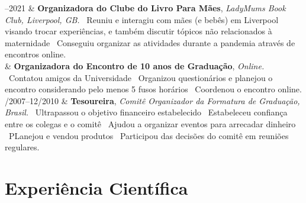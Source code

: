 \documentclass[11pt, a4paper]{article}
\newcommand{\Duration}[2]{\fontsize{10pt}{0}\selectfont #1--#2}
\newcommand{\Year}[1]{\fontsize{10pt}{0}\selectfont #1}
\begin{document}
\begin{EntriesTable}
	\Duration{2020}{2021}  &
	\textbf{Organizadora do Clube do Livro Para Mães},
	\newline
	\textit{ LadyMums Book Club, Liverpool, GB.}
	\newline
	\textbullet \ Reuniu e interagiu com mães (e bebês) em Liverpool visando
	trocar experiências, e também discutir tópicos não relacionados à maternidade
	\textbullet \ Conseguiu organizar as atividades durante a pandemia 
	através de encontros online.
	\\
	\Year{2020}  &
	\textbf{Organizadora do Encontro de 10 anos de Graduação},
	\newline
	\textit{ Online.}
	\newline
	\textbullet \ Contatou amigos da Universidade
	\textbullet \ Organizou questionários e planejou o encontro
	considerando pelo menos 5 fusos horários
	\textbullet \ Coordenou o encontro online.
	\\
	\Duration{04/2007}{12/2010}  &
	\textbf{Tesoureira},
	\newline
	\textit{ Comitê Organizador da Formatura de Graduação, Brasil.}
	\newline
	\textbullet \ Ultrapassou o objetivo financeiro estabelecido
	\textbullet \ Estabeleceu confiança entre os colegas e o comitê
	\textbullet \ Ajudou a organizar eventos para arrecadar dinheiro
	\textbullet \ PLanejou e vendou produtos
	\textbullet \ Participou das decisões do comitê em reuniões regulares.

\end{EntriesTable}

\section*{Experiência Científica}
\end{document}
